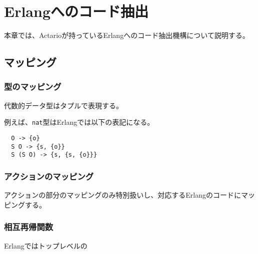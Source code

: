 \chapter{Erlangへのコード抽出}

本章では、Actarioが持っているErlangへのコード抽出機構について説明する。

\section{マッピング}

\subsection{型のマッピング}

代数的データ型はタプルで表現する。

例えば、\texttt{nat}型はErlangでは以下の表記になる。


\begin{lstlisting}
  O -> {o}
  S O -> {s, {o}}
  S (S O) -> {s, {s, {o}}}
\end{lstlisting}

\subsection{アクションのマッピング}

アクションの部分のマッピングのみ特別扱いし、対応するErlangのコードにマッピングする。

\subsection{相互再帰関数}

Erlangではトップレベルの
